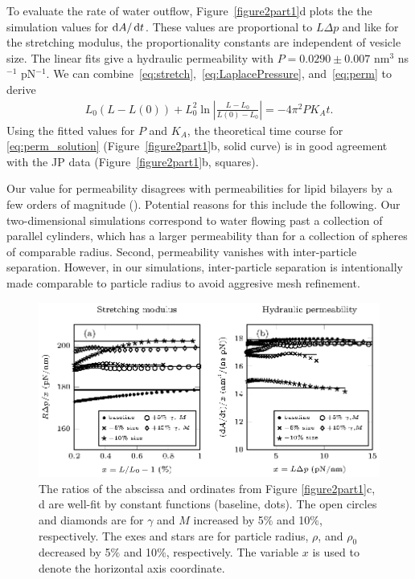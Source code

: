 \documentclass[lineno]{jfm}
\begin{document}
To evaluate the rate of water outflow, 
Figure~\ref{figure2part1}d plots the the simulation values for $\dif A/\dif t$.  
These values are proportional to $L\Delta p$ and like for the stretching modulus, 
the proportionality constants are 
independent of vesicle size.
The  linear fits give a hydraulic permeability with $P = 0.0290 \pm 0.007$ nm$^3$ ns$^{-1}$ pN$^{-1}$.
We can combine~\eqref{eq:stretch},~\eqref{eq:LaplacePressure},
and~\eqref{eq:perm} to derive
\begin{align}
\label{eq:perm_solution}
L_0(L-L(0)) + L_0^2 \ln\left|\frac{L-L_0}{L(0)-L_0}\right| = -4\pi^2 P K_A t.
\end{align}
Using the fitted values for $P$ and $K_A$, the theoretical time course for 
\eqref{eq:perm_solution} (Figure~\ref{figure2part1}b, solid curve) is in good
agreement with the JP data (Figure~\ref{figure2part1}b, squares).

Our value for permeability disagrees 
with permeabilities for lipid bilayers by a few orders of magnitude  (\cite{chabanon2017, qua-gan-you2021}).
Potential reasons for this include the following. 
Our two-dimensional simulations correspond to water flowing past a collection
of parallel cylinders, which has a larger permeability than for a collection
of spheres of comparable radius.   
Second, permeability vanishes with inter-particle separation.  
However, in our simulations, inter-particle separation is intentionally made comparable to 
particle radius to avoid aggresive mesh refinement.

\begin{figure}
\centering
\includegraphics[width=\textwidth]{fig8.eps}
\caption{\label{figure2}  
The ratios of the abscissa and ordinates from Figure \ref{figure2part1}c, d are well-fit by constant functions (baseline, dots).
The open circles and diamonds are for $\gamma$ and $M$ increased by 5$\%$ and 10$\%$, respectively. 
The exes and stars are for particle radius, $\rho$, and $\rho_0$ decreased by 5$\%$ and 10$\%$, respectively.
The variable $x$ is used to denote the horizontal axis coordinate. 
}
\end{figure}
\end{document}

